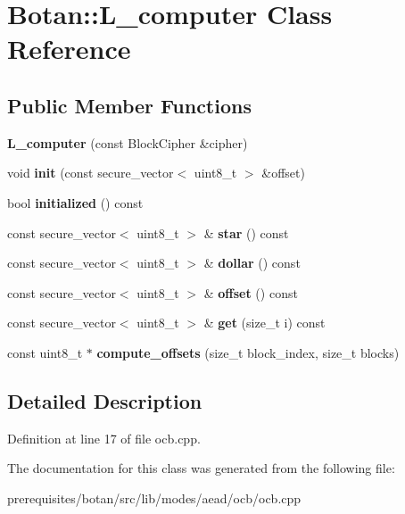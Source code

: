 \hypertarget{class_botan_1_1_l__computer}{}\section{Botan\+:\+:L\+\_\+computer Class Reference}
\label{class_botan_1_1_l__computer}
\subsection*{Public Member Functions}
\begin{DoxyCompactItemize}
\item 
\mbox{\label{class_botan_1_1_l__computer_aa8a24c53406fd4049637d55df721f62e}} 
{\bfseries L\+\_\+computer} (const Block\+Cipher \&cipher)
\item 
\mbox{\label{class_botan_1_1_l__computer_af9377c5e702ea99b3092682612af41de}} 
void {\bfseries init} (const secure\+\_\+vector$<$ uint8\+\_\+t $>$ \&offset)
\item 
\mbox{\label{class_botan_1_1_l__computer_a231cd0344b89499ea4bb11c1120aa69d}} 
bool {\bfseries initialized} () const
\item 
\mbox{\label{class_botan_1_1_l__computer_a3cf73852f679dacae5aeaf87a6d73672}} 
const secure\+\_\+vector$<$ uint8\+\_\+t $>$ \& {\bfseries star} () const
\item 
\mbox{\label{class_botan_1_1_l__computer_ac755716db54b176e2f9b845c07bad39b}} 
const secure\+\_\+vector$<$ uint8\+\_\+t $>$ \& {\bfseries dollar} () const
\item 
\mbox{\label{class_botan_1_1_l__computer_a017bd9a184656b42b0124a628d311564}} 
const secure\+\_\+vector$<$ uint8\+\_\+t $>$ \& {\bfseries offset} () const
\item 
\mbox{\label{class_botan_1_1_l__computer_a90a9f6f339fcea085421441c491e2346}} 
const secure\+\_\+vector$<$ uint8\+\_\+t $>$ \& {\bfseries get} (size\+\_\+t i) const
\item 
\mbox{\label{class_botan_1_1_l__computer_a8a3ade5e6d6e13797889619474f0a64f}} 
const uint8\+\_\+t $\ast$ {\bfseries compute\+\_\+offsets} (size\+\_\+t block\+\_\+index, size\+\_\+t blocks)
\end{DoxyCompactItemize}


\subsection{Detailed Description}


Definition at line 17 of file ocb.\+cpp.



The documentation for this class was generated from the following file\+:\begin{DoxyCompactItemize}
\item 
prerequisites/botan/src/lib/modes/aead/ocb/ocb.\+cpp\end{DoxyCompactItemize}
